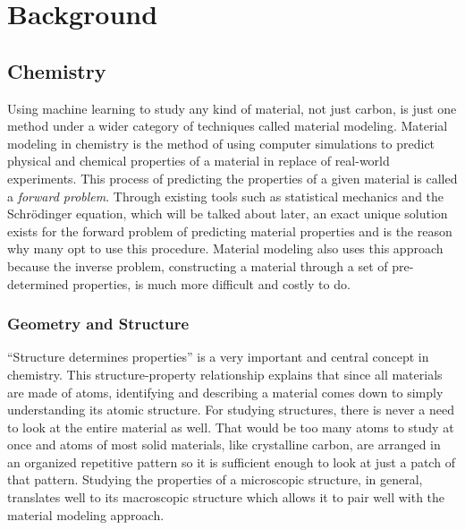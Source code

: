\documentclass[12pt]{scrartcl}
\begin{document}
\newpage

\section{Background}

\subsection{Chemistry}

Using machine learning to study any kind of material, not just carbon, 
is just one method under a wider category of techniques called material modeling. 
Material modeling in chemistry is the method of using computer simulations to predict 
physical and chemical properties of a material in replace of real-world experiments. 
This process of predicting the properties of a given material is called a \emph{forward 
problem}. Through existing tools such as statistical mechanics and the Schrödinger 
equation, which will be talked about later, an exact unique solution exists for the 
forward problem of predicting material properties and is the reason why many opt to 
use this procedure. Material modeling also uses this approach because the inverse 
problem, constructing a material through a set of pre-determined properties, 
is much more difficult and costly to do.

\subsubsection{Geometry and Structure}
``Structure determines properties'' is a very important and central concept in chemistry. 
This structure-property relationship explains that since all materials are made of atoms, identifying 
and describing a material comes down to simply understanding its atomic structure. For studying 
structures, there is never a need to look at the entire material as well. That would be too many 
atoms to study at once and atoms of most solid materials, like crystalline carbon, are arranged in 
an organized repetitive pattern so it is sufficient enough to look at just a patch of that pattern. 
Studying the properties of a microscopic structure, in general, translates well to its macroscopic 
structure which allows it to pair well with the material modeling approach.
\end{document}
